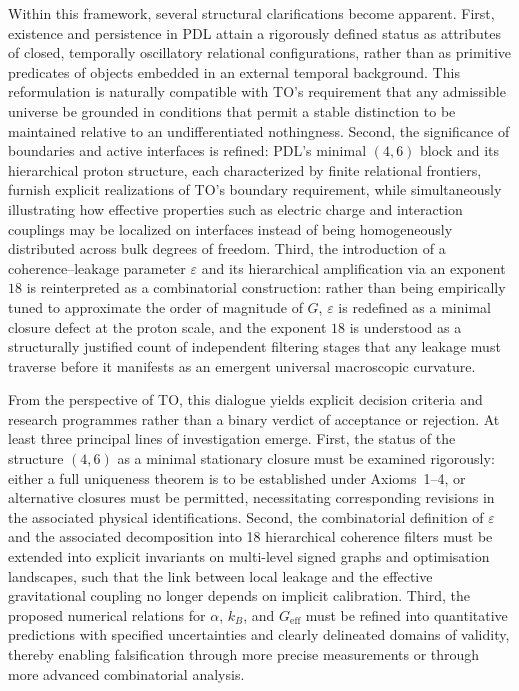 \documentclass[11pt,a4paper]{article}
\begin{document}
Within this framework, several structural clarifications become apparent. First, existence and persistence in PDL attain a rigorously defined status as attributes of closed, temporally oscillatory relational configurations, rather than as primitive predicates of objects embedded in an external temporal background. This reformulation is naturally compatible with TO’s requirement that any admissible universe be grounded in conditions that permit a stable distinction to be maintained relative to an undifferentiated nothingness. Second, the significance of boundaries and active interfaces is refined: PDL’s minimal $(4,6)$ block and its hierarchical proton structure, each characterized by finite relational frontiers, furnish explicit realizations of TO’s boundary requirement, while simultaneously illustrating how effective properties such as electric charge and interaction couplings may be localized on interfaces instead of being homogeneously distributed across bulk degrees of freedom. Third, the introduction of a coherence–leakage parameter $\varepsilon$ and its hierarchical amplification via an exponent $18$ is reinterpreted as a combinatorial construction: rather than being empirically tuned to approximate the order of magnitude of $G$, $\varepsilon$ is redefined as a minimal closure defect at the proton scale, and the exponent $18$ is understood as a structurally justified count of independent filtering stages that any leakage must traverse before it manifests as an emergent universal macroscopic curvature.

From the perspective of TO, this dialogue yields explicit decision criteria and research programmes rather than a binary verdict of acceptance or rejection. At least three principal lines of investigation emerge. First, the status of the structure $(4,6)$ as a minimal stationary closure must be examined rigorously: either a full uniqueness theorem is to be established under Axioms~1–4, or alternative closures must be permitted, necessitating corresponding revisions in the associated physical identifications. Second, the combinatorial definition of $\varepsilon$ and the associated decomposition into 18 hierarchical coherence filters must be extended into explicit invariants on multi-level signed graphs and optimisation landscapes, such that the link between local leakage and the effective gravitational coupling no longer depends on implicit calibration. Third, the proposed numerical relations for $\alpha$, $k_B$, and $G_{\mathrm{eff}}$ must be refined into quantitative predictions with specified uncertainties and clearly delineated domains of validity, thereby enabling falsification through more precise measurements or through more advanced combinatorial analysis.
\end{document}

